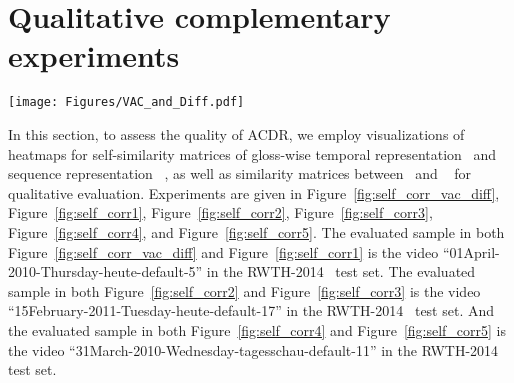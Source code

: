 \documentclass[sigconf]{acmart}
\begin{document}
\section{Qualitative complementary experiments}

\begin{figure*}
  \centering
  \texttt{[image: Figures/VAC\_and\_Diff.pdf]}
\caption{ The visualizations of heatmaps for self-similarity matrices of gloss-wise temporal representation  and sequence representation , as well as similarity matrices between  and ~(the darker color represents the higher similarity). 
  VAC+ACDR refers to the VAC with its knowledge distillation loss (VA loss) replaced by ACDR optimization equipped with gloss-wise semantic condition .
  VAC+ACDR denotes the VAC enhanced by ACDR with both gloss-wise temporal semantic conditions and gloss semantic conditions.
 }
    
  \label{fig:self_corr_vac_diff}
\end{figure*}

In this section, to assess the quality of ACDR, we employ visualizations of heatmaps for self-similarity matrices of gloss-wise temporal representation~ and sequence representation ~, as well as similarity matrices between~ and ~ for qualitative evaluation.
Experiments are given in Figure~\ref{fig:self_corr_vac_diff}, Figure~\ref{fig:self_corr1}, Figure~\ref{fig:self_corr2}, Figure~\ref{fig:self_corr3}, Figure~\ref{fig:self_corr4}, and Figure~\ref{fig:self_corr5}.
The evaluated sample in both Figure~\ref{fig:self_corr_vac_diff} and  Figure~\ref{fig:self_corr1} is the video ``01April-2010-Thursday-heute-default-5'' in the RWTH-2014~\cite{koller2015continuous} test set.
The evaluated sample in both Figure~\ref{fig:self_corr2} and  Figure~\ref{fig:self_corr3} is the video ``15February-2011-Tuesday-heute-default-17'' in the RWTH-2014~\cite{koller2015continuous} test set.
And the evaluated sample in both Figure~\ref{fig:self_corr4} and  Figure~\ref{fig:self_corr5} is the video ``31March-2010-Wednesday-tagesschau-default-11'' in the RWTH-2014~\cite{koller2015continuous} test set.
\end{document}
